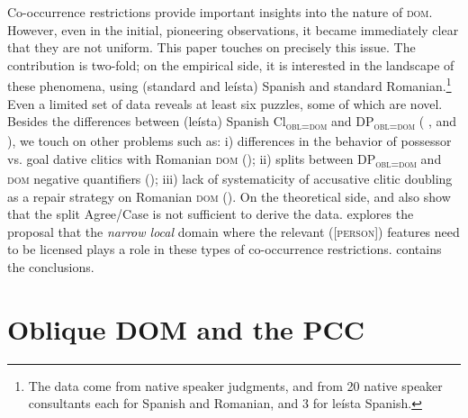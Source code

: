 \documentclass[output=paper,colorlinks,citecolor=brown,draft,draftmode]{langscibook}
\begin{document}
Co-occurrence restrictions provide important insights into the nature of \textsc{dom}. However, even in the initial, pioneering observations, it became immediately clear that they are not uniform. This paper touches on precisely this issue. The contribution is two-fold; on the empirical side, it is interested in the landscape of these phenomena, using (standard and leísta) Spanish and standard Romanian.\footnote{The data come from native speaker judgments, and  from 20 native speaker consultants each for Spanish and Romanian, and 3 for leísta Spanish.} Even a limited set of data reveals at least six puzzles, some of which are novel. Besides the differences between (leísta) Spanish Cl\textsubscript{\textsc{obl=dom}} and  DP\textsubscript{\textsc{obl=dom}}   (\citeauthor{ormromero07} \citeyear{ormromero07},  and ), we touch on other problems such as: i) differences in the behavior of possessor vs. goal dative clitics with Romanian \textsc{dom} ({}); ii) splits between DP\textsubscript{\textsc{obl=dom}} and \textsc{dom} negative quantifiers (); iii) lack of systematicity of accusative clitic doubling as a repair strategy on  Romanian \textsc{dom} (). On the theoretical side,  and  also show that the split Agree/Case is not sufficient to derive the data.  explores the proposal that the \textit{narrow local} domain where the relevant ([\textsc{person}]) features need to be licensed plays a role in these types of co-occurrence restrictions.  contains the conclusions.

\section{Oblique \textsc{DOM} and the \textsc{PCC}}\label{sec:irimia:Section2DOMPCC}
\end{document}
